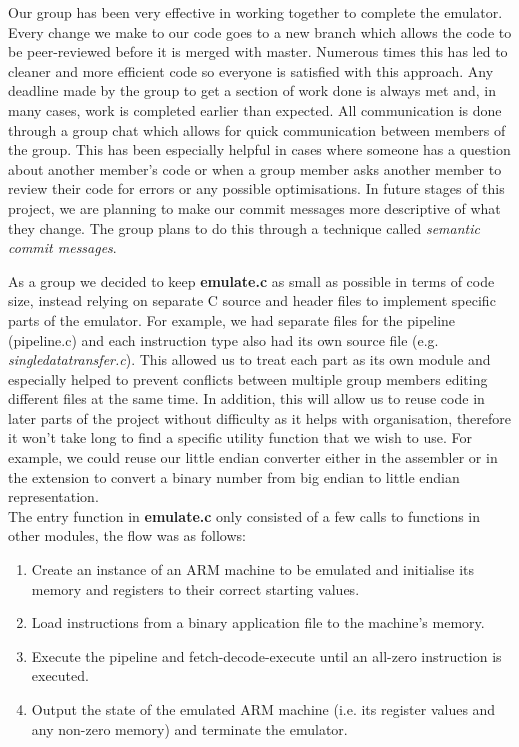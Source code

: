 \documentclass{article}
\begin{document}
Our group has been very effective in working together to complete the emulator.  Every change we make to our code goes to a new branch which allows the code to be peer-reviewed before it is merged with master. Numerous times this has led to cleaner and more efficient code so everyone is satisfied with this approach. Any deadline made by the group to get a section of work done is always met and, in many cases, work is completed earlier than expected. All communication is done through a group chat which allows for quick communication between members of the group. This has been especially helpful in cases where someone has a question about another member's code or when a group member asks another member to review their code for errors or any possible optimisations. In future stages of this project, we are planning to make our commit messages more descriptive of what they change. The group plans to do this through a technique called \textit{semantic commit messages}.\par
As a group we decided to keep \textbf{emulate.c} as small as possible in terms of code size, instead relying on separate C source and header files to implement specific parts of the emulator. For example, we had separate files for the pipeline (\textbf{}{pipeline.c}) and each instruction type also had its own source file (e.g. \textit{singledatatransfer.c}). This allowed us to treat each part as its own module and especially helped to prevent conflicts between multiple group members editing different files at the same time. In addition, this will allow us to reuse code in later parts of the project without difficulty as it helps with organisation, therefore it won't take long to find a specific utility function that we wish to use. For example, we could reuse our little endian converter either in the assembler or in the extension to convert a binary number from big endian to little endian representation.\\The entry function in \textbf{emulate.c} only consisted of a few calls to functions in other modules, the flow was as follows:
\begin{enumerate}
    \item Create an instance of an ARM machine to be emulated and initialise its memory and registers to their correct starting values.
    \item Load instructions from a binary application file to the machine's memory.
    \item Execute the pipeline and fetch-decode-execute until an all-zero instruction is executed.
    \item Output the state of the emulated ARM machine (i.e. its register values and any non-zero memory) and terminate the emulator.
\end{enumerate}
\end{document}
